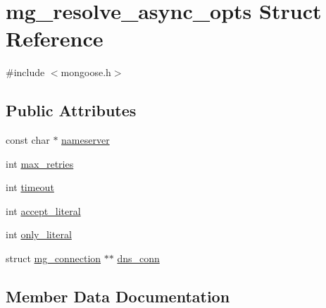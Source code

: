 \hypertarget{structmg__resolve__async__opts}{}\section{mg\+\_\+resolve\+\_\+async\+\_\+opts Struct Reference}
\label{structmg__resolve__async__opts}


{\ttfamily \#include $<$mongoose.\+h$>$}

\subsection*{Public Attributes}
\begin{DoxyCompactItemize}
\item 
const char $\ast$ \hyperlink{structmg__resolve__async__opts_a2fb7183d887260a2b3576e47641e96dc_a2fb7183d887260a2b3576e47641e96dc}{nameserver}
\item 
int \hyperlink{structmg__resolve__async__opts_a6db0305ac9736d2f98507ce07bebcd59_a6db0305ac9736d2f98507ce07bebcd59}{max\+\_\+retries}
\item 
int \hyperlink{structmg__resolve__async__opts_adeb3e0102e6e1eb86340e86fcc2b3560_adeb3e0102e6e1eb86340e86fcc2b3560}{timeout}
\item 
int \hyperlink{structmg__resolve__async__opts_a9e7955b13fd4cac697a92ca28dff30ae_a9e7955b13fd4cac697a92ca28dff30ae}{accept\+\_\+literal}
\item 
int \hyperlink{structmg__resolve__async__opts_ae7bb70da865548e33663e1292e334293_ae7bb70da865548e33663e1292e334293}{only\+\_\+literal}
\item 
struct \hyperlink{structmg__connection}{mg\+\_\+connection} $\ast$$\ast$ \hyperlink{structmg__resolve__async__opts_ac82e8d612fe2f822fc99ca3bd2d9921c_ac82e8d612fe2f822fc99ca3bd2d9921c}{dns\+\_\+conn}
\end{DoxyCompactItemize}


\subsection{Member Data Documentation}
\mbox{\label{structmg__resolve__async__opts_a9e7955b13fd4cac697a92ca28dff30ae_a9e7955b13fd4cac697a92ca28dff30ae}} 
